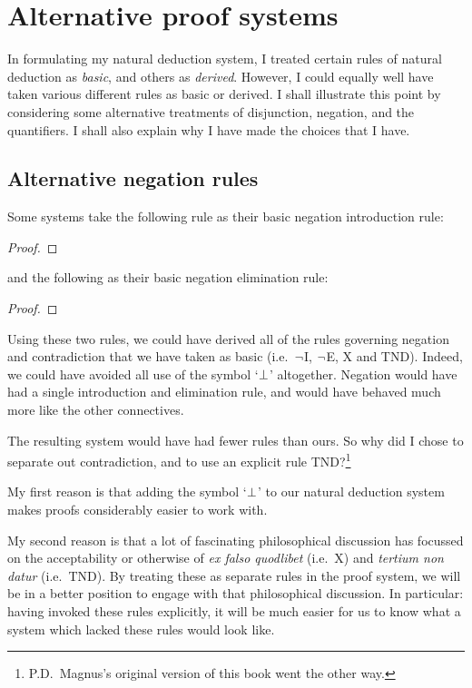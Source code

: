
\chapter{Alternative proof systems}
In formulating my natural deduction system, I treated certain rules of natural deduction as \emph{basic}, and others as \emph{derived}. However, I could equally well have taken various different rules as basic or derived. I shall illustrate this point by considering some alternative treatments of disjunction, negation, and the quantifiers. I shall also explain why I have made the choices that I have.

\section{Alternative negation rules}
Some systems take the following rule as their basic negation introduction rule:
\begin{proof}
	\open
	\close
\end{proof}
and the following as their basic negation elimination rule:
\begin{proof}
	\open
	\close
\end{proof}
Using these two rules, we could have derived all of the rules governing negation and contradiction that we have taken as basic (i.e.\ $\neg$I, $\neg$E, X and TND). Indeed, we could have avoided all use of the symbol `$\bot$' altogether. Negation would have had a single introduction and elimination rule, and would have behaved much more like the other connectives.

The resulting system would have had fewer rules than ours. So why did I chose to separate out contradiction, and to use an explicit rule TND?\footnote{P.D.\ Magnus's original version of this book went the other way.}

My first reason is that adding the symbol `$\bot$' to our natural deduction system makes proofs considerably easier to work with.

My second reason is that a lot of fascinating philosophical discussion has focussed on the acceptability or otherwise of \emph{ex falso quodlibet} (i.e.\ X) and \emph{tertium non datur} (i.e.\ TND). By treating these as separate rules in the proof system, we will be  in a better position to engage with that philosophical discussion. In particular: having invoked these rules explicitly, it will be much easier for us to know what a system which lacked these rules would look like.

